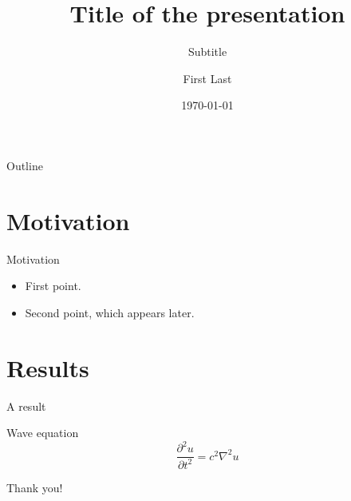 \documentclass[aspectratio=169]{beamer}
\title{Title of the presentation}
\subtitle{Subtitle}
\author{First Last}
\institute{Institution}
\date{\today}
\begin{document}
\begin{frame}
  \titlepage
\end{frame}

\begin{frame}{Outline}
  \tableofcontents
\end{frame}

\section{Motivation}

\begin{frame}{Motivation}
  \begin{itemize}
    \item<1-> First point.
    \item<2-> Second point, which appears later.
  \end{itemize}
\end{frame}

\section{Results}

\begin{frame}{A result}
  \begin{block}{Wave equation}
    \[
      \frac{\partial^2 u}{\partial t^2} = c^2 \nabla^2 u
    \]
  \end{block}
\end{frame}

\begin{frame}
  \centering\Large Thank you!
\end{frame}
\end{document}
